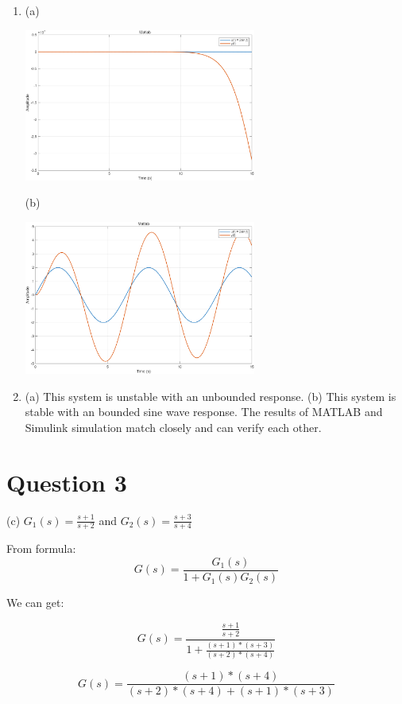 \documentclass[12pt]{article}
\begin{document}
\begin{enumerate}[label=\roman*.]
    \item (a)
    \begin{center}
        \includegraphics[width=0.6\textwidth]{Q2mata.png}
    \end{center}
    (b)
    \begin{center}
        \includegraphics[width=0.6\textwidth]{Q2matb.png}
    \end{center}

    \item (a) This system is unstable with an unbounded response.
    (b) This system is stable with an bounded sine wave response.
    The results of MATLAB and Simulink simulation match closely and can verify each other.
\end{enumerate}

\section*{Question 3}
(c)
$G_1(s) = \frac{s+1}{s+2}$ and $G_2(s) = \frac{s+3}{s+4}$

From formula: \[G(s) = \frac{G_1(s)}{1+G_1(s)G_2(s)}\]

We can get:

\[G(s) = \frac{\frac{s+1}{s+2}}{1 + \frac{(s+1) * (s+3)}{(s+2) * (s+4)}}\]

\[G(s) = \frac{(s+1) * (s+4)}{(s+2)*(s+4) + (s+1)*(s+3)}\]
\end{document}
